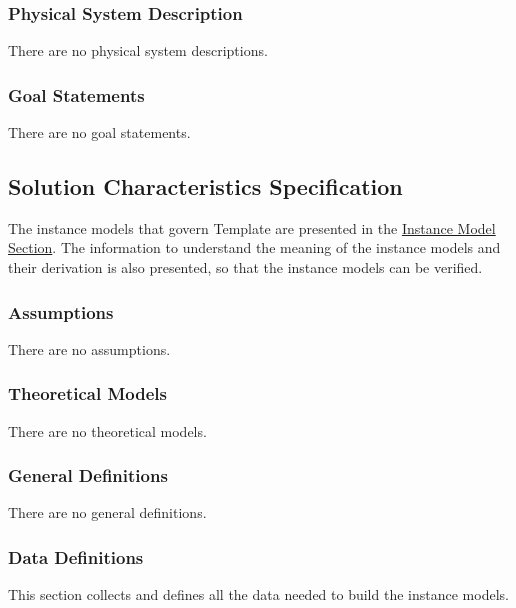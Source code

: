\documentclass[12pt]{article}
\begin{document}
\subsubsection{Physical System Description}
\label{Sec:PhysSyst}
There are no physical system descriptions.

\subsubsection{Goal Statements}
\label{Sec:GoalStmt}
There are no goal statements.

\subsection{Solution Characteristics Specification}
\label{Sec:SolCharSpec}
The instance models that govern Template are presented in the \hyperref[Sec:IMs]{Instance Model Section}. The information to understand the meaning of the instance models and their derivation is also presented, so that the instance models can be verified.

\subsubsection{Assumptions}
\label{Sec:Assumps}
There are no assumptions.

\subsubsection{Theoretical Models}
\label{Sec:TMs}
There are no theoretical models.

\subsubsection{General Definitions}
\label{Sec:GDs}
There are no general definitions.

\subsubsection{Data Definitions}
\label{Sec:DDs}
This section collects and defines all the data needed to build the instance models.
\end{document}
